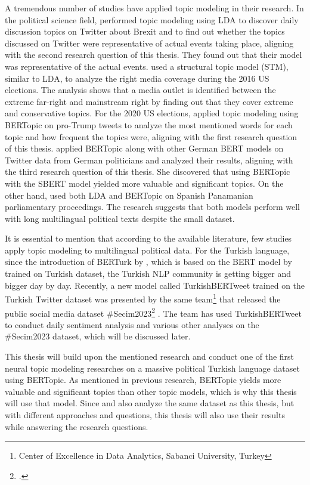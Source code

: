 A tremendous number of studies have applied topic modeling in their research. 
In the political science field, \textcite{ilyas_brexit_topic_modeling_2020} performed topic modeling 
using LDA to discover daily discussion topics on Twitter about Brexit and to find out whether 
the topics discussed on Twitter were representative of actual events taking place,
aligning with the second research question of this thesis.
They found out that their model was representative of the actual events.
\textcite{kaiser_right_media_USA_stm_topic_modeling_2020} used a structural topic model (STM), 
similar to LDA, to analyze the right media coverage during the 2016 US elections. 
The analysis shows that a media outlet is identified between the extreme far-right and 
mainstream right by finding out that they cover extreme and conservative topics.
For the 2020 US elections, \textcite{anwar_analyzing_twitter_BERT_QAnon_2021} applied 
topic modeling using BERTopic on pro-Trump tweets to analyze the most mentioned words for 
each topic and how frequent the topics were, aligning with the first research question of this thesis.
\textcite{bertopic_twitter_german_politics_2022} applied BERTopic along with other 
German BERT models on Twitter data from German politicians and analyzed their results,
aligning with the third research question of this thesis.
She discovered that using BERTopic with the SBERT model yielded more valuable and significant topics.
On the other hand, \textcite{contreras_panama_lda_bertopic_2022} used both LDA and BERTopic 
on Spanish Panamanian parliamentary proceedings. The research suggests that both 
models perform well with long multilingual political texts despite the small dataset. 

It is essential to mention that according to the available literature, few studies 
apply topic modeling to multilingual political data. For the Turkish language, 
since the introduction of BERTurk by \textcite{schweter_berturk_2020}, which is 
based on the BERT model by \textcite{devlin_bert_2019} trained on Turkish dataset,
the Turkish NLP community is getting bigger and bigger day by day. 
Recently, a new model called TurkishBERTweet trained on the Turkish Twitter dataset 
was presented by the same team\footnote{Center of Excellence in Data Analytics, Sabanci University, Turkey} 
that released the public social media dataset \#Secim2023\footcite{secim2023} \parencite{turkishbertweet_2023}. 
The team has used TurkishBERTweet to conduct daily sentiment analysis and 
various other analyses on the \#Secim2023 dataset, which will be discussed later.

This thesis will build upon the mentioned research and conduct one of the first 
neural topic modeling researches on a massive political Turkish language dataset using BERTopic. 
As mentioned in previous research, BERTopic yields more valuable and significant topics than 
other topic models, which is why this thesis will use that model.
Since \textcite{turkishbertweet_2023} and also \textcite{secim2023} analyze the same dataset 
as this thesis, but with different approaches and questions, this thesis will also use their 
results while answering the research questions.


